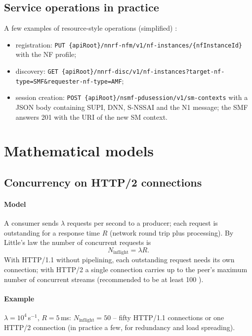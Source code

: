 \documentclass[11pt,a4paper]{article}
\begin{document}
\subsection{Service operations in practice}
A few examples of resource-style operations (simplified) \cite{ts29510}:
\begin{itemize}
  \item registration: \nolinkurl{PUT {apiRoot}/nnrf-nfm/v1/nf-instances/{nfInstanceId}} with the NF profile;
  \item discovery: \nolinkurl{GET {apiRoot}/nnrf-disc/v1/nf-instances?target-nf-type=SMF&requester-nf-type=AMF};
  \item session creation: \nolinkurl{POST {apiRoot}/nsmf-pdusession/v1/sm-contexts} with a JSON body containing SUPI, DNN, S-NSSAI
        and the N1 message; the SMF answers 201 with the URI of the new SM context.
\end{itemize}

\section{Mathematical models}

\subsection{Concurrency on HTTP/2 connections}\label{sec:inflight}
\paragraph{Model} A consumer sends $\lambda$ requests per second to a producer; each request is outstanding for a response time
$R$ (network round trip plus processing). By Little's law the number of concurrent requests is
\begin{equation}\label{eq:inflight}
  N_{\mathrm{inflight}} = \lambda R .
\end{equation}
With HTTP/1.1 without pipelining, each outstanding request needs its own connection; with HTTP/2 a single connection carries up to
the peer's maximum number of concurrent streams (recommended to be at least 100 \cite{rfc9113}).
\paragraph{Example} $\lambda = 10^4$\,s$^{-1}$, $R = 5$\,ms: $N_{\mathrm{inflight}} = 50$ -- fifty HTTP/1.1 connections or one HTTP/2
connection (in practice a few, for redundancy and load spreading).
\end{document}
